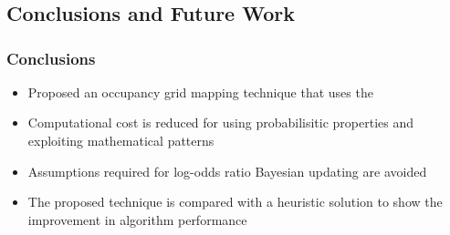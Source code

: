 \documentclass[11pt,professionalfonts,hyperref={pdftex,pdfpagemode=none,pdfstartview=FitH}]{beamer}
\renewcommand{\emph}[1]{\textit{\textbf{\color{blue}{#1}}}}
\begin{document}
\begin{frame}
\begin{itemize}
\begin{figure}
{	\hspace*{0.2cm}
	}
\end{figure}
\end{itemize}

\end{frame}





\section*{}
\subsection*{Conclusions and Future Work}

\begin{frame}
\frametitle{Conclusions}
\begin{itemize}
        	\item Proposed an occupancy grid mapping technique that uses the \emph{exact probabilistic solution}
	\item Computational cost is reduced \emph{substantially} for \emph{real-time implementation} using probabilisitic properties and exploiting mathematical patterns
	\item Assumptions required for log-odds ratio Bayesian updating are avoided
	\item The proposed technique is compared with a heuristic solution to show the improvement in algorithm performance 
\end{itemize}
\end{frame}
\end{document}
